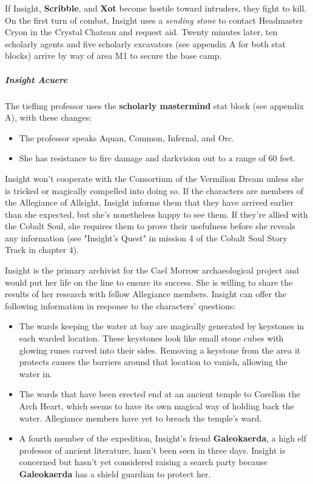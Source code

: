 \documentclass[10pt,a4paper,twoside,fancy,bg=print,twocolumn,openany,nodeprecatedcode]{dndbook}
\begin{document}
If Insight, \textbf{Scribble}, and \textbf{Xot} become hostile toward intruders, they fight to kill. On the first turn of combat, Insight uses a \textit{sending stone} to contact Headmaster Cryon in the Crystal Chateau and request aid. Twenty minutes later, ten scholarly agents and five scholarly excavators (see appendix A for both stat blocks) arrive by way of area M1 to secure the base camp.

\subparagraph{Insight Acuere}
The tiefling professor uses the \textbf{scholarly mastermind} stat block (see appendix A), with these changes:


\begin{itemize}
\item The professor speaks Aquan, Common, Infernal, and Orc.
\item She has resistance to fire damage and darkvision out to a range of 60 feet.
\end{itemize}

Insight won't cooperate with the Consortium of the Vermilion Dream unless she is tricked or magically compelled into doing so. If the characters are members of the Allegiance of Allsight, Insight informs them that they have arrived earlier than she expected, but she's nonetheless happy to see them. If they're allied with the Cobalt Soul, she requires them to prove their usefulness before she reveals any information (see "Insight's Quest" in mission 4 of the Cobalt Soul Story Track in chapter 4).

Insight is the primary archivist for the Cael Morrow archaeological project and would put her life on the line to ensure its success. She is willing to share the results of her research with fellow Allegiance members. Insight can offer the following information in response to the characters' questions:


\begin{itemize}
\item The wards keeping the water at bay are magically generated by keystones in each warded location. These keystones look like small stone cubes with glowing runes carved into their sides. Removing a keystone from the area it protects causes the barriers around that location to vanish, allowing the water in.
\item The wards that have been erected end at an ancient temple to Corellon the Arch Heart, which seems to have its own magical way of holding back the water. Allegiance members have yet to breach the temple's ward.
\item A fourth member of the expedition, Insight's friend \textbf{Galeokaerda}, a high elf professor of ancient literature, hasn't been seen in three days. Insight is concerned but hasn't yet considered raising a search party because \textbf{Galeokaerda} has a shield guardian to protect her.
\end{itemize}
\end{document}
